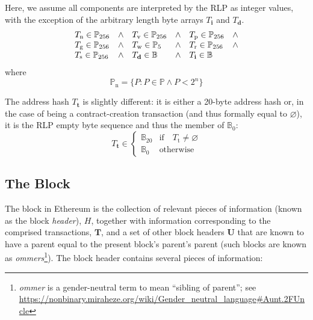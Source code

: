 \documentclass[9pt,oneside]{amsart}
\makeatletter
\newcommand{\linkdest}[1]{\Hy@raisedlink{\hypertarget{#1}{}}}
\makeatother
\begin{document}
\begin{multicols}{2}
Here, we assume all components are interpreted by the RLP as integer values, with the exception of the arbitrary length byte arrays $T_{\mathbf{i}}$ and $T_{\mathbf{d}}$.
\begin{equation}
\begin{array}[t]{lclclc}
T_{\mathrm{n}} \in \mathbb{P}_{256} & \wedge & T_{\mathrm{v}} \in \mathbb{P}_{256} & \wedge & T_{\mathrm{p}} \in \mathbb{P}_{256} & \wedge \\
T_{\mathrm{g}} \in \mathbb{P}_{256} & \wedge & T_{\mathrm{w}} \in \mathbb{P}_5 & \wedge & T_{\mathrm{r}} \in \mathbb{P}_{256} & \wedge \\
T_{\mathrm{s}} \in \mathbb{P}_{256} & \wedge & T_{\mathbf{d}} \in \mathbb{B} & \wedge & T_{\mathbf{i}} \in \mathbb{B}
\end{array}
\end{equation}
where
\begin{equation}
\mathbb{P}_{\mathrm{n}} = \{ P: P \in \mathbb{P} \wedge P < 2^n \}
\end{equation}

The address hash $T_{\mathbf{t}}$ is slightly different: it is either a 20-byte address hash or, in the case of being a contract-creation transaction (and thus formally equal to $\varnothing$), it is the RLP empty byte sequence and thus the member of $\mathbb{B}_0$:
\begin{equation}
T_{\mathbf{t}} \in \begin{cases} \mathbb{B}_{20} & \text{if} \quad T_{\mathrm{t}} \neq \varnothing \\
\mathbb{B}_{0} & \text{otherwise}\end{cases}
\end{equation}

\subsection{The Block}\linkdest{block}\label{subsec:The_Block}

The block in Ethereum is the collection of relevant pieces of information (known as the block \textit{header}), $H$, together with information corresponding to the comprised transactions, $\mathbf{T}$,\hypertarget{ommerheaders}{} and a set of other block headers $\mathbf{U}$ that are known to have a parent equal to the present block's parent's parent (such blocks are known as \textit{ommers}\footnote{\textit{ommer} is a gender-neutral term to mean ``sibling of parent''; see \url{https://nonbinary.miraheze.org/wiki/Gender_neutral_language\#Aunt.2FUncle}}). The block header contains several pieces of information:


\end{multicols}
\end{document}
